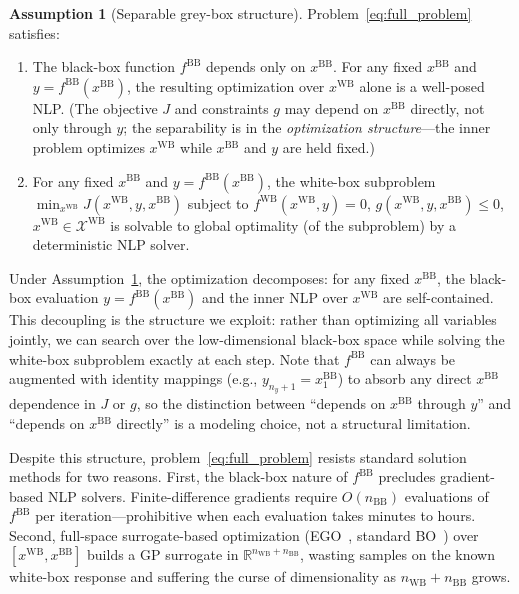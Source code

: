\documentclass[12pt,a4paper]{article}%
\theoremstyle{plain}%
\theoremstyle{remark}%
\theoremstyle{definition}%
\newtheorem{assumption}{Assumption}%
\def\WB{\mathrm{WB}}
\def\BB{\mathrm{BB}}
\begin{document}
\begin{assumption}[Separable grey-box structure]\label{ass:separability}
Problem~\eqref{eq:full_problem} satisfies:
\begin{enumerate}
    \item[(i)] The black-box function $f^{\BB}$ depends only on $x^{\BB}$. For any fixed $x^{\BB}$ and $y = f^{\BB}(x^{\BB})$, the resulting optimization over $x^{\WB}$ alone is a well-posed NLP. (The objective $J$ and constraints $g$ may depend on $x^{\BB}$ directly, not only through $y$; the separability is in the \emph{optimization structure}---the inner problem optimizes $x^{\WB}$ while $x^{\BB}$ and $y$ are held fixed.)
    \item[(ii)] For any fixed $x^{\BB}$ and $y = f^{\BB}(x^{\BB})$, the white-box subproblem $\min_{x^{\WB}} J(x^{\WB}, y, x^{\BB})$ subject to $f^{\WB}(x^{\WB}, y) = 0$, $g(x^{\WB}, y, x^{\BB}) \leq 0$, $x^{\WB} \in \mathcal{X}^{\WB}$ is solvable to global optimality (of the subproblem) by a deterministic NLP solver.
\end{enumerate}
\end{assumption}

Under Assumption~\ref{ass:separability}, the optimization decomposes: for any fixed $x^{\BB}$, the black-box evaluation $y = f^{\BB}(x^{\BB})$ and the inner NLP over $x^{\WB}$ are self-contained. This decoupling is the structure we exploit: rather than optimizing all variables jointly, we can search over the low-dimensional black-box space while solving the white-box subproblem exactly at each step. Note that $f^{\BB}$ can always be augmented with identity mappings (e.g., $y_{n_y+1} = x^{\BB}_1$) to absorb any direct $x^{\BB}$ dependence in $J$ or $g$, so the distinction between ``depends on $x^{\BB}$ through $y$'' and ``depends on $x^{\BB}$ directly'' is a modeling choice, not a structural limitation.

Despite this structure, problem~\eqref{eq:full_problem} resists standard solution methods for two reasons. First, the black-box nature of $f^{\BB}$ precludes gradient-based NLP solvers. Finite-difference gradients require $O(n_{\BB})$ evaluations of $f^{\BB}$ per iteration---prohibitive when each evaluation takes minutes to hours. Second, full-space surrogate-based optimization (EGO~\cite{jones1998efficient}, standard BO~\cite{frazier2018tutorial}) over $[x^{\WB}, x^{\BB}]$ builds a GP surrogate in $\mathbb{R}^{n_{\WB}+n_{\BB}}$, wasting samples on the known white-box response and suffering the curse of dimensionality as $n_{\WB}+n_{\BB}$ grows.
\end{document}
